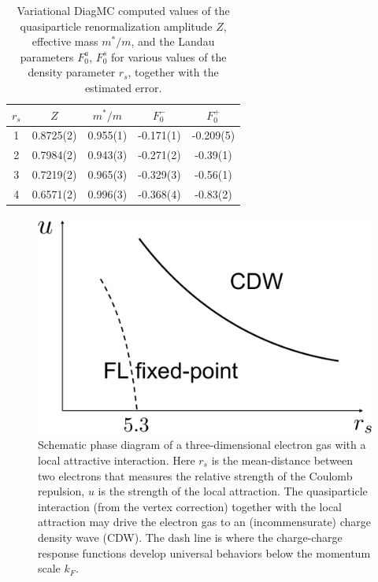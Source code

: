 \documentclass[reprint,amsmath,amssymb,aps,prb]{revtex4-1}
\begin{document}
\begin{table}
    \begin{center}
        \begin{tabular}{|c|c|c|c|c|}
            \hline
            $r_s$ & $Z$       & $m^*/m$  & $F_0^-$   & $F_0^+$   \\
            \hline
            1     & 0.8725(2) & 0.955(1) & -0.171(1) & -0.209(5) \\
            \hline
            2     & 0.7984(2) & 0.943(3) & -0.271(2) & -0.39(1)  \\
            \hline
            3     & 0.7219(2) & 0.965(3) & -0.329(3) & -0.56(1)  \\
            \hline
            4     & 0.6571(2) & 0.996(3) & -0.368(4) & -0.83(2)  \\
            \hline
        \end{tabular}
    \end{center}
    \caption{
        Variational DiagMC computed values of the quasiparticle renormalization amplitude
        $Z$, effective mass $m^*/m$, and the Landau parameters $F_0^a$,
        $F_0^s$ for various values of the density parameter $r_s$, together
        with the estimated error.
    }
    \label{tab1}
\end{table}

\begin{figure}
    \centering
    \includegraphics[width=0.9\linewidth]{phase diagram.pdf}
    \caption{Schematic phase diagram of a three-dimensional electron gas with a local attractive interaction. Here $r_s$ is the mean-distance between two electrons that measures the relative strength of the Coulomb repulsion, $u$ is the strength of the local attraction. The quasiparticle interaction (from the vertex correction) together with the local attraction may drive the electron gas to an (incommensurate) charge density wave (CDW). The dash line is where the charge-charge response functions develop universal behaviors below the momentum scale $k_F$.}
    \label{fig:phasediagram}
\end{figure}
\end{document}

